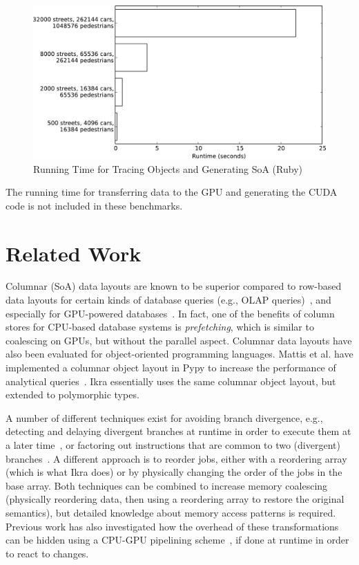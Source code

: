 \documentclass[preprint]{sigplanconf}
\begin{document}
\begin{figure}[!htp]
    \includegraphics[width=\columnwidth]{obj_tracer.pdf}
    \centering
    \caption{Running Time for Tracing Objects and Generating SoA (Ruby)}
    \label{fig:tracing}
\end{figure}

The running time for transferring data to the GPU and generating the CUDA code is not included in these benchmarks.

\section{Related Work}
Columnar (SoA) data layouts are known to be superior compared to row-based data layouts for certain kinds of database queries (e.g., OLAP queries)~\cite{Plattner:2009:CDA:1559845.1559846}, and especially for GPU-powered databases~\cite{Bakkum:2010:ASD:1735688.1735706}. In fact, one of the benefits of column stores for CPU-based database systems is \emph{prefetching}, which is similar to coalescing on GPUs, but without the parallel aspect. Columnar data layouts have also been evaluated for object-oriented programming languages. Mattis et al. have implemented a columnar object layout in Pypy to increase the performance of analytical queries~\cite{Mattis:2015:COI:2814228.2814230}. Ikra essentially uses the same columnar object layout, but extended to polymorphic types.

A number of different techniques exist for avoiding branch divergence, e.g., detecting and delaying divergent branches at runtime in order to execute them at a later time~\cite{88d22b7f17}, or factoring out instructions that are common to two (divergent) branches~\cite{Han:2011:RBD:1964179.1964184}. A different approach is to reorder jobs, either with a reordering array (which is what Ikra does) or by physically changing the order of the jobs in the base array. Both techniques can be combined to increase memory coalescing~\cite{Zhang:2011:OED:1950365.1950408} (physically reordering data, then using a reordering array to restore the original semantics), but detailed knowledge about memory access patterns is required. Previous work has also investigated how the overhead of these transformations can be hidden using a CPU-GPU pipelining scheme~\cite{Zhang:2010:SGA:1810085.1810104}, if done at runtime in order to react to changes.
\end{document}

